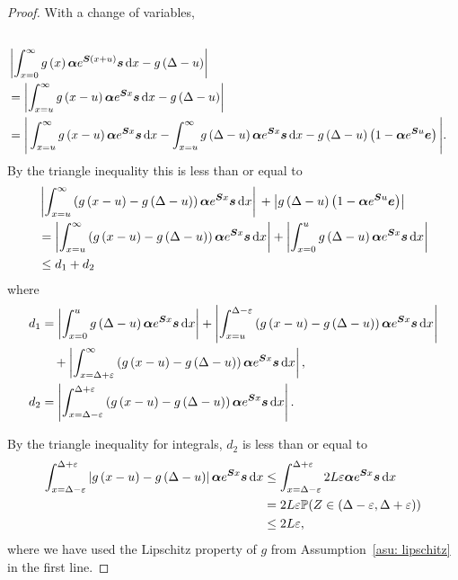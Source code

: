 \begin{proof}
	With a change of variables, 
	\begin{align*}
		\\&\left|\int_{x=0}^\infty g\left(x\right)\boldsymbol \alpha  e^{\boldsymbol{S} \left(x+u\right)} \boldsymbol s \, \mathrm{d} x - g\left(\Delta-u\right)\right| 
		\\&= \left|\int_{x=u}^\infty g\left(x-u\right)\boldsymbol \alpha  e^{\boldsymbol{S} x} \boldsymbol s \, \mathrm{d} x - g\left(\Delta-u\right)\right| 
		\\&= \Bigg|\int_{x=u}^\infty g\left(x-u\right)\boldsymbol \alpha  e^{\boldsymbol{S} x} \boldsymbol s \, \mathrm{d} x - \int_{x=u}^\infty g\left(\Delta-u\right)\boldsymbol\alpha  e^{\boldsymbol{S} x}\boldsymbol s\, \mathrm{d} x - g\left(\Delta-u\right)\left(1-\boldsymbol\alpha  e^{\boldsymbol{S} u}\boldsymbol e \right)\Bigg|.
	\end{align*}
	{By the triangle inequality this is less than or equal to}
	\begin{align*}
		&\left|\int_{x=u}^\infty \left(g\left(x-u\right)- g\left(\Delta-u\right)\right)\boldsymbol \alpha  e^{\boldsymbol{S} x} \boldsymbol s \, \mathrm{d} x \right| 
		{}+ \left|g\left(\Delta-u\right)\left(1-\boldsymbol\alpha  e^{\boldsymbol{S} u}\boldsymbol e \right)\right|
		\\&= \left|\int_{x=u}^\infty \left(g\left(x-u\right)- g\left(\Delta-u\right)\right)\boldsymbol \alpha  e^{\boldsymbol{S} x} \boldsymbol s \, \mathrm{d} x\right| 
		+ \left|\int_{x=0}^u g\left(\Delta-u\right)\boldsymbol \alpha  e^{\boldsymbol{S} x} \boldsymbol s \, \mathrm{d} x \right| 
		\\&\leq d_1 +{d_2} 
	\end{align*}
	where 
	\begin{align*}
		d_1 &= \left|\int_{x=0}^u g\left(\Delta-u\right)\boldsymbol \alpha  e^{\boldsymbol{S} x} \boldsymbol s \, \mathrm{d} x\right| + \left|\int_{x=u}^{\Delta-\varepsilon } \left(g\left(x-u\right)- g\left(\Delta-u\right)\right)\boldsymbol \alpha  e^{\boldsymbol{S} x} \boldsymbol s \, \mathrm{d} x \right| 
		\\&\quad{}+ \left|\int_{x=\Delta+\varepsilon }^{\infty} \left(g\left(x-u\right)- g\left(\Delta-u\right)\right)\boldsymbol \alpha  e^{\boldsymbol{S} x} \boldsymbol s \, \mathrm{d} x \right|,
	\\{d_2} &= \left|\int_{x=\Delta-\varepsilon }^{\Delta+\varepsilon } \left(g\left(x-u\right)- g\left(\Delta-u\right)\right)\boldsymbol \alpha  e^{\boldsymbol{S} x} \boldsymbol s \, \mathrm{d} x\right| .
	\end{align*}

	By the triangle inequality for integrals, \({d_2} \) is less than or equal to
	\begin{align*}
		\int_{x=\Delta-\varepsilon }^{\Delta+\varepsilon } \left|g\left(x-u\right)- g\left(\Delta-u\right)\right|\boldsymbol \alpha  e^{\boldsymbol{S} x} \boldsymbol s \, \mathrm{d} x
		&\leq \int_{x=\Delta-\varepsilon }^{\Delta+\varepsilon } 2L\varepsilon \boldsymbol \alpha  e^{\boldsymbol{S} x} \boldsymbol s \, \mathrm{d} x
		\\&=2L\varepsilon \mathbb P(Z\in(\Delta-\varepsilon, \Delta+\varepsilon))
		\\&\leq 2L\varepsilon ,
	\end{align*}
	where we have used the Lipschitz property of \(g\) from Assumption~\ref{asu: lipschitz} in the first line. 
	

\end{proof}
